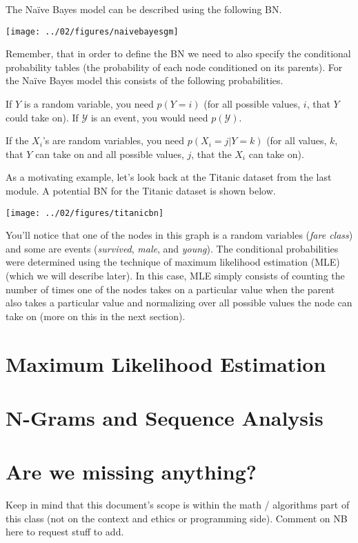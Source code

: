 \documentclass{tufte-handout}
\begin{document}
The Na\"ive Bayes model can be described using the following BN.

\begin{center}
\texttt{[image: ../02/figures/naivebayesgm]}
\end{center}

Remember, that in order to define the BN we need to also specify the conditional probability tables (the probability of each node conditioned on its parents).  For the Na\"ive Bayes model this consists of the following probabilities.

\bi
\item If $Y$ is a random variable, you need $p(Y=i)$ (for all possible values, $i$, that $Y$ could take on).  If $\mathcal{Y}$ is an event, you would need $p(\mathcal{Y})$.
\item If the $X_i$'s are random variables, you need $p(X_i=j | Y=k)$ (for all values, $k$, that $Y$ can take on and all possible values, $j$, that the $X_i$ can take on).
\ei

As a motivating example, let's look back at the Titanic dataset from the last module.  A potential BN for the Titanic dataset is shown below.

\begin{center}
\texttt{[image: ../02/figures/titanicbn]}
\end{center}

You'll notice that one of the nodes in this graph is a random variables (\emph{fare class}) and some are events (\emph{survived}, \emph{male}, and \emph{young}).  The conditional probabilities were determined using the technique of maximum likelihood estimation (MLE) (which we will describe later).  In this case, MLE simply consists of counting the number of times one of the nodes takes on a particular value when the parent also takes a particular value and normalizing over all possible values the node can take on (more on this in the next section).

\section{Maximum Likelihood Estimation}


\section{N-Grams and Sequence Analysis}


\section{Are we missing anything?}
Keep in mind that this document's scope is within the math / algorithms part of this class (not on the context and ethics or programming side).  Comment on NB here to request stuff to add. 
\end{document}

